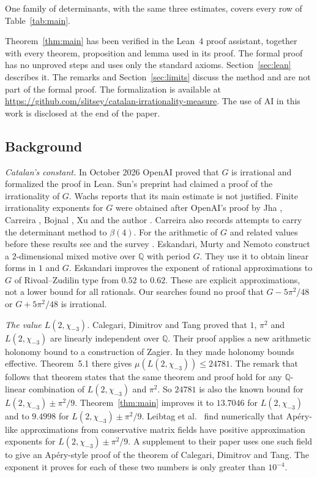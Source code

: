 \documentclass[11pt]{amsart}
\newcommand{\FormalizationURL}{https://github.com/slitsey/catalan-irrationality-measure}
\newcommand{\FormalizationLink}{\url{\FormalizationURL}}
\theoremstyle{definition}
\theoremstyle{remark}
\numberwithin{equation}{section}
\newcommand{\Q}{\mathbb Q}
\newcommand{\MuThirdsU}{9.4998}
\newcommand{\MuChi}{13.7046}
\begin{document}
One family of determinants, with the same three estimates, covers every row of Table~\ref{tab:main}.

Theorem~\ref{thm:main} has been verified in the Lean~4 proof assistant, together with every theorem, proposition and
lemma used in its proof. The formal proof has no unproved steps and uses only the standard axioms.
Section~\ref{sec:lean} describes it. The remarks and Section~\ref{sec:limits} discuss the method and are not part of the
formal proof. The formalization is available at \FormalizationLink. The use of AI in this work is disclosed at the end
of the paper.

\subsection{Background}
\emph{Catalan's constant.} In October 2026 OpenAI \cite{OpenAI2026} proved that $G$ is irrational and formalized the
proof in Lean. Sun's preprint \cite{Sun2026} had claimed a proof of the irrationality of $G$. Wachs \cite{Wachs2026}
reports that its main estimate is not justified. Finite irrationality exponents for $G$ were obtained after OpenAI's
proof by Jha \cite{Jha2026}, Carreira \cite{Carreira2026}, Bojnal \cite{Bojnal2026}, Xu \cite{Xu2026} and the author
\cite{Litsey2026}. Carreira \cite{Carreira2026b} also records attempts to carry the determinant method to $\beta(4)$. For
the arithmetic of $G$ and related values before these results see
\cite{RivoalZudilin2003,Zudilin2003,Zudilin02Cheb,KrattRivoal08,KrattZudilin19} and the survey \cite{Zudilin19Survey}.
Eskandari, Murty and Nemoto \cite{EMN2025} construct a $2$-dimensional mixed motive over $\Q$ with period $G$. They use
it to obtain linear forms in $1$ and $G$. Eskandari \cite{Eskandari2026} improves the exponent of rational approximations
to $G$ of Rivoal--Zudilin type from $0.52$ to $0.62$. These are explicit approximations, not a lower bound for all
rationals. Our searches found no proof that $G-5\pi^2/48$ or $G+5\pi^2/48$ is irrational.

\emph{The value $L(2,\chi_{-3})$.} Calegari, Dimitrov and Tang \cite{CDT2024} proved that $1$, $\pi^2$ and
$L(2,\chi_{-3})$ are linearly independent over $\Q$. Their proof applies a new arithmetic holonomy bound to a
construction of Zagier. In \cite{CDT2025} they made holonomy bounds effective. Theorem~5.1 there gives
$\mu(L(2,\chi_{-3}))\le24781$. The remark that follows that theorem states that the same theorem and proof hold for any
$\Q$-linear combination of $L(2,\chi_{-3})$ and $\pi^2$. So $24781$ is also the known bound for
$L(2,\chi_{-3})\pm\pi^2/9$. Theorem~\ref{thm:main} improves it to $\MuChi$ for $L(2,\chi_{-3})$ and to $\MuThirdsU$ for
$L(2,\chi_{-3})\pm\pi^2/9$. Leibtag et al.\ \cite{LBKWSK26} find numerically that Ap\'ery-like approximations from
conservative matrix fields have positive approximation exponents for $L(2,\chi_{-3})\pm\pi^2/9$. A supplement to their
paper uses one such field to give an Ap\'ery-style proof of the theorem of Calegari, Dimitrov and Tang. The exponent it
proves for each of these two numbers is only greater than $10^{-4}$.
\end{document}
